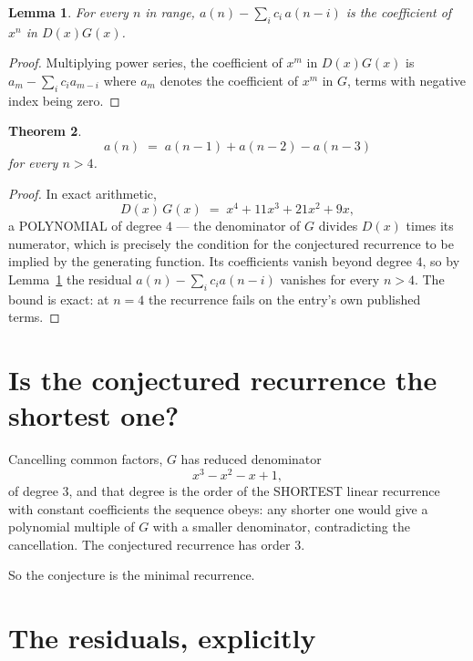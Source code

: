\documentclass[11pt,a4paper]{article}
\theoremstyle{plain}
\newtheorem{theorem}{Theorem}
\newtheorem{lemma}[theorem]{Lemma}
\theoremstyle{definition}
\begin{document}
\begin{lemma}\label{lem:key}
For every $n$ in range, $a(n)-\sum_i c_i\,a(n-i)$ is the coefficient of $x^{n}$ in
$D(x)G(x)$.
\end{lemma}

\begin{proof}
Multiplying power series, the coefficient of $x^{m}$ in $D(x)G(x)$ is
$a_m-\sum_i c_i a_{m-i}$ where $a_m$ denotes the coefficient of $x^{m}$ in $G$, terms with
negative index being zero.
\end{proof}

\begin{theorem}
\[
a(n)\;=\;a(n-1) + a(n-2) - a(n-3)
\]
for every $n>4$.
\end{theorem}

\begin{proof}
In exact arithmetic,
\[
D(x)\,G(x)\;=\;x^{4} + 11 x^{3} + 21 x^{2} + 9 x,
\]
a POLYNOMIAL of degree $4$ --- the denominator of $G$ divides $D(x)$ times its numerator,
which is precisely the condition for the conjectured recurrence to be implied by the
generating function. Its coefficients vanish beyond degree $4$, so by
Lemma~\ref{lem:key} the residual $a(n)-\sum_ic_ia(n-i)$ vanishes for every
$n>4$. The bound is exact: at $n=4$ the recurrence fails on the entry's own published terms.
\end{proof}

\section{Is the conjectured recurrence the shortest one?}

Cancelling common factors, $G$ has reduced denominator
\[
x^{3} - x^{2} - x + 1,
\]
of degree $3$, and that degree is the order of the SHORTEST linear recurrence with
constant coefficients the sequence obeys: any shorter one would give a polynomial multiple of
$G$ with a smaller denominator, contradicting the cancellation. The conjectured recurrence has
order $3$.

So the conjecture is the minimal recurrence.

\section{The residuals, explicitly}
\end{document}
